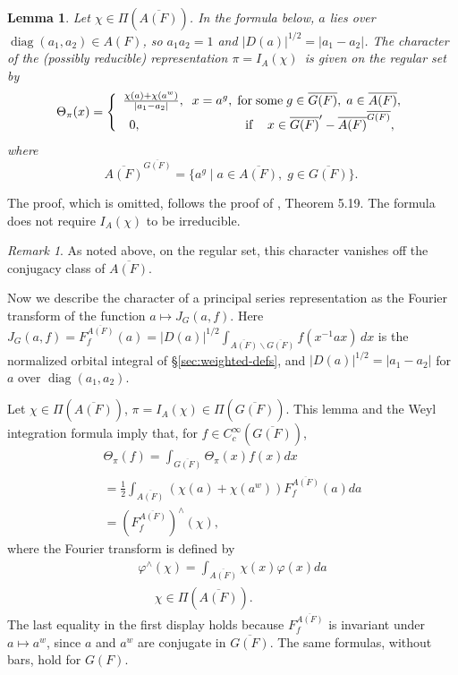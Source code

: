 \documentclass[12pt,letterpaper,openany]{book}
\theoremstyle{plain}
\newtheorem{lemma}[theorem]{Lemma}
\theoremstyle{definition}
\theoremstyle{remark}
\newtheorem{remark}[theorem]{Remark}
\theoremstyle{remark}
\begin{document}
\begin{lemma}
Let $\chi\in \Pi (\overline{A(F)})$. In the formula below,
$a$ lies over $\operatorname{diag}(a_1,a_2)\in A(F)$,
so $a_1a_2=1$ and
$|D(a)|^{1/2}=|a_1-a_2|$.
The character of the
(possibly reducible) representation $\pi =I_{A}(\chi )$\ is given on the regular
set by
\[
\Theta _\pi (x)=\left\{
\begin{array}{c}
\frac{\chi (a)+\chi (a^w)}{|a_1-a_2|},
\;\;x=a^g,\;{\rm for\;some}\;g\in \overline{G(F)},
\;a\in \overline{A(F)}, \\
0,\;\;\;\;\;\;\;\;\;\;\;\;\;\;\;\;\;\;\;\;\;\;\;\;\;\;\;\;\;
{\rm \;if\;}\;\;\;
x\in \overline{G(F)}^{\prime }-\overline{A(F)}^{\overline{G(F)}},
\end{array}
\right.
\]
where
\[
\overline{A(F)}^{\overline{G(F)}}=\{a^g\;|\;a\in \overline{A(F)},\;g\in
\overline{G(F)}\}.\
\]
\end{lemma}

The proof, which is omitted, follows the proof of \cite{Ge1}, Theorem 5.19.
The formula does not require $I_A(\chi)$ to be irreducible.

\begin{remark} As noted above, on the regular set,
this character vanishes off the conjugacy class of $\overline{A(F)}$.
\end{remark}

Now we describe the character of a principal series representation
as the Fourier transform of the function $a\longmapsto J_G(a,f)$.
Here $J_G(a,f)=F_f^{\overline{A(F)}}(a)=|D(a)|^{1/2}\int_{\overline{A(F)}\backslash\overline{G(F)}}f(x^{-1}ax)\,dx$
is the normalized orbital integral of \S\ref{sec:weighted-defs}, and
$|D(a)|^{1/2}=|a_1-a_2|$ for $a$ over $\operatorname{diag}(a_1,a_2)$.

Let $\chi \in \Pi (\overline{A(F)})$,
$\pi =I_{A}(\chi )\in \Pi (\overline{G(F)})$.
This lemma and the Weyl integration formula
imply that, for $f\in C_c^\infty
(\overline{G(F)})$,
\begin{equation}
\begin{array}{c}
\Theta _\pi (f)=\int_{\overline{G(F)}}\Theta _\pi (x)f(x)dx \\
=\frac 12\int_{\overline{A(F)}}(\chi (a)+
\chi(a^w))F_f^{\overline{A(F)}}(a)da \\
=(F_f^{\overline{A(F)}})^{\wedge }(\chi ) ,
\end{array}
\end{equation}
where the Fourier transform is defined by
\begin{equation}
\begin{array}{c}
\varphi ^{\wedge }(\chi )=\int_{\overline{A(F)}}\chi (x)\varphi
(x)da \\
\ \ \ \ \ \ \chi \in \Pi (\overline{A(F)}).
\end{array}
\end{equation}
The last equality in the first display holds because $F_f^{\overline{A(F)}}$ is
invariant under $a\mapsto a^w$, since $a$ and $a^w$ are conjugate in
$\overline{G(F)}$. The same formulas, without bars, hold for $G(F)$.
\end{document}
